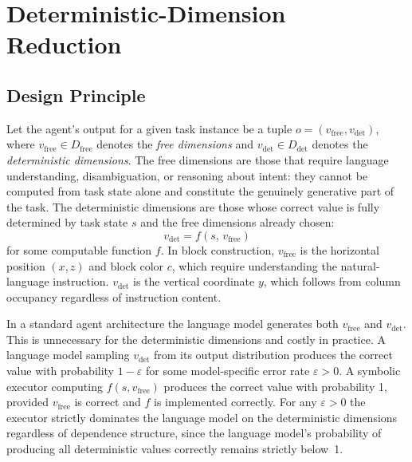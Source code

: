 \documentclass[10pt]{article}
\begin{document}
\section{Deterministic-Dimension Reduction}

\subsection{Design Principle}

Let the agent's output for a given task instance be a tuple
$o = (v_{\mathrm{free}}, v_{\mathrm{det}})$, where
$v_{\mathrm{free}} \in D_{\mathrm{free}}$ denotes the \emph{free dimensions}
and $v_{\mathrm{det}} \in D_{\mathrm{det}}$ denotes the \emph{deterministic
dimensions}. The free dimensions are those that require language
understanding, disambiguation, or reasoning about intent: they cannot be
computed from task state alone and constitute the genuinely generative part
of the task. The deterministic dimensions are those whose correct value is
fully determined by task state $s$ and the free dimensions already chosen:
\[
  v_{\mathrm{det}} = f(s,\, v_{\mathrm{free}})
\]
for some computable function $f$. In block construction, $v_{\mathrm{free}}$
is the horizontal position $(x, z)$ and block color $c$, which require
understanding the natural-language instruction. $v_{\mathrm{det}}$ is the
vertical coordinate $y$, which follows from column occupancy regardless of
instruction content.

In a standard agent architecture the language model generates both
$v_{\mathrm{free}}$ and $v_{\mathrm{det}}$. This is unnecessary for the
deterministic dimensions and costly in practice. A language model sampling
$v_{\mathrm{det}}$ from its output distribution produces the correct value
with probability $1 - \varepsilon$ for some model-specific error rate
$\varepsilon > 0$. A symbolic executor computing $f(s, v_{\mathrm{free}})$
produces the correct value with probability 1, provided $v_{\mathrm{free}}$
is correct and $f$ is implemented correctly. For any $\varepsilon > 0$ the
executor strictly dominates the language model on the deterministic
dimensions regardless of dependence structure, since the language model's
probability of producing all deterministic values correctly remains
strictly below~1.
\end{document}
